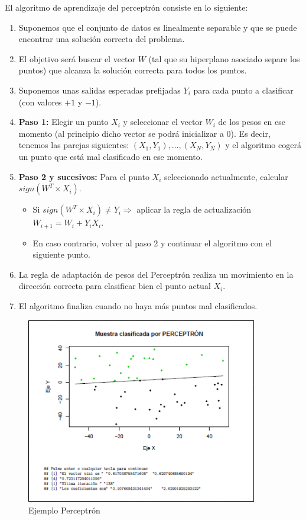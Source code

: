 \documentclass[a4paper, 11pt]{article} %
\begin{document}
El algoritmo de aprendizaje del perceptrón consiste en lo siguiente:
\begin{enumerate}
    \item Suponemos que el conjunto de datos es linealmente separable y que se puede encontrar una solución correcta del problema.
    \item El objetivo será buscar el vector $W$ (tal que su hiperplano asociado separe los puntos) que alcanza la solución correcta para todos los puntos.
    \item Suponemos unas salidas esperadas prefijadas $Y_i$ para cada punto a clasificar (con valores $+1$ y $-1$).
    \item \textbf{Paso 1:} Elegir un punto $X_i$ y seleccionar el vector $W_i$ de los pesos en ese momento (al principio dicho vector se podrá inicializar a $0$). Es decir, tenemos las parejas siguientes: ${(X_1, Y_1), ..., (X_N, Y_N)}$ y el algoritmo cogerá un punto que está mal clasificado en ese momento.
    \item \textbf{Paso 2 y sucesivos:} Para el punto $X_i$ seleccionado actualmente, calcular $sign(W^T \times X_i)$.
    \begin{itemize}
        \item Si $sign(W^T \times X_i) \neq Y_i \Rightarrow$ aplicar la regla de actualización $W_{i+1} = W_i + Y_iX_i$.
        \item En caso contrario, volver al paso 2 y continuar el algoritmo con el siguiente punto.
    \end{itemize}
    \item La regla de adaptación de pesos del Perceptrón realiza un movimiento en la dirección correcta para clasificar bien el punto actual $X_i$.
    \item El algoritmo finaliza cuando no haya más puntos mal clasificados.
\end{enumerate}

\begin{figure}[H]
\centering
\includegraphics[width=0.9\textwidth]{ejemploPerceptron.PNG}
\caption{Ejemplo Perceptrón}
\label{Ejemplo Perceptron}
\end{figure}
\end{document}
